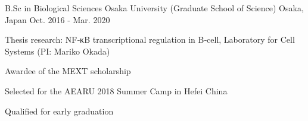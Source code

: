 \begin{cventries}

  \cventry
    {B.Sc in Biological Sciences} %
    {Osaka University (Graduate School of Science)} %
    {Osaka, Japan} %
    {Oct. 2016 - Mar. 2020} %
    {
      \begin{cvitems} %
        \item {Thesis research: NF‑κB transcriptional regulation in B‑cell, Laboratory for Cell Systems (PI: Mariko Okada)}
        \item {Awardee of the MEXT scholarship}
        \item {Selected for the AEARU 2018 Summer Camp in Hefei China}
        \item {Qualified for early graduation}
      \end{cvitems}
    }

\end{cventries}